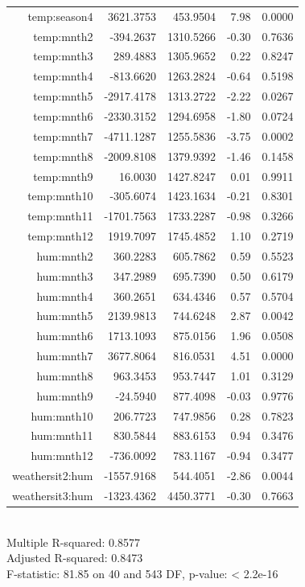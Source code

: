 \begin{table}[H]
\begin{tabular}{rrrrr}
$$  temp:season4 & 3621.3753 & 453.9504 & 7.98 & 0.0000 \\ 
  temp:mnth2 & -394.2637 & 1310.5266 & -0.30 & 0.7636 \\ 
  temp:mnth3 & 289.4883 & 1305.9652 & 0.22 & 0.8247 \\ 
  temp:mnth4 & -813.6620 & 1263.2824 & -0.64 & 0.5198 \\ 
  temp:mnth5 & -2917.4178 & 1313.2722 & -2.22 & 0.0267 \\ 
  temp:mnth6 & -2330.3152 & 1294.6958 & -1.80 & 0.0724 \\ 
  temp:mnth7 & -4711.1287 & 1255.5836 & -3.75 & 0.0002 \\ 
  temp:mnth8 & -2009.8108 & 1379.9392 & -1.46 & 0.1458 \\ 
  temp:mnth9 & 16.0030 & 1427.8247 & 0.01 & 0.9911 \\ 
  temp:mnth10 & -305.6074 & 1423.1634 & -0.21 & 0.8301 \\ 
  temp:mnth11 & -1701.7563 & 1733.2287 & -0.98 & 0.3266 \\ 
  temp:mnth12 & 1919.7097 & 1745.4852 & 1.10 & 0.2719 \\ 
  hum:mnth2 & 360.2283 & 605.7862 & 0.59 & 0.5523 \\ 
  hum:mnth3 & 347.2989 & 695.7390 & 0.50 & 0.6179 \\ 
  hum:mnth4 & 360.2651 & 634.4346 & 0.57 & 0.5704 \\ 
  hum:mnth5 & 2139.9813 & 744.6248 & 2.87 & 0.0042 \\ 
  hum:mnth6 & 1713.1093 & 875.0156 & 1.96 & 0.0508 \\ 
  hum:mnth7 & 3677.8064 & 816.0531 & 4.51 & 0.0000 \\ 
  hum:mnth8 & 963.3453 & 953.7447 & 1.01 & 0.3129 \\ 
  hum:mnth9 & -24.5940 & 877.4098 & -0.03 & 0.9776 \\ 
  hum:mnth10 & 206.7723 & 747.9856 & 0.28 & 0.7823 \\ 
  hum:mnth11 & 830.5844 & 883.6153 & 0.94 & 0.3476 \\ 
  hum:mnth12 & -736.0092 & 783.1167 & -0.94 & 0.3477 \\ 
  weathersit2:hum & -1557.9168 & 544.4051 & -2.86 & 0.0044 \\ 
  weathersit3:hum & -1323.4362 & 4450.3771 & -0.30 & 0.7663 \\ 
   \hline
\end{tabular}
\\
Multiple R-squared:  0.8577 \\
Adjusted R-squared:  0.8473 \\
F-statistic: 81.85 on 40 and 543 DF,  p-value: < 2.2e-16 \\
\end{table}

